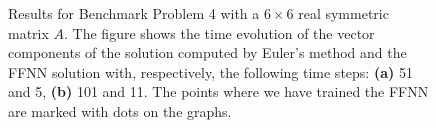 \begin{figure}[H]
\centering
{}
\qquad
{}
\caption{Results for Benchmark Problem 4 with a $6\times 6$ real symmetric matrix $A$. The figure shows the time evolution of the vector components of the solution computed by Euler's method and the FFNN solution with, respectively, the following time steps: \textbf{(a)} 51 and 5, \textbf{(b)} 101 and 11. The points where we have trained the FFNN are marked with dots on the graphs.}
\label{fig:benchrun4_comp_1}
\end{figure}

